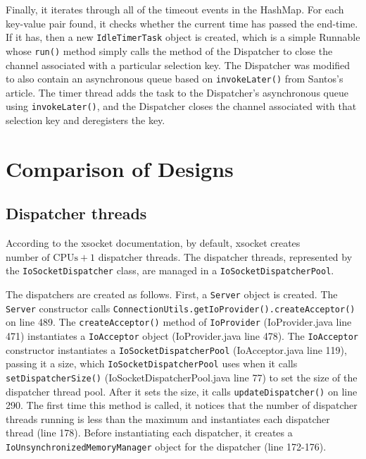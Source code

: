 \documentclass[letterpaper,12pt]{article}
\begin{document}
Finally, it iterates through all of the timeout events in the HashMap. For each key-value pair found, it checks whether the current time has passed the end-time. If it has, then a new \texttt{IdleTimerTask} object is created, which is a simple Runnable whose \texttt{run()} method simply calls the method of the Dispatcher to close the channel associated with a particular selection key. The Dispatcher was modified to also contain an asynchronous queue based on \texttt{invokeLater()} from Santos's article. The timer thread adds the task to the Dispatcher's asynchronous queue using \texttt{invokeLater()}, and the Dispatcher closes the channel associated with that selection key and deregisters the key.


\section{Comparison of Designs}

\subsection{Dispatcher threads}

According to the xsocket documentation, by default, xsocket creates $\text{number of CPUs} + 1$ dispatcher threads. The dispatcher threads, represented by the \texttt{IoSocketDispatcher} class, are managed in a \texttt{IoSocketDispatcherPool}.

The dispatchers are created as follows. First, a \texttt{Server} object is created. The \texttt{Server} constructor calls \texttt{ConnectionUtils.getIoProvider().createAcceptor()} on line 489. The \texttt{createAcceptor()} method of \texttt{IoProvider} (IoProvider.java line 471) instantiates a \texttt{IoAcceptor} object (IoProvider.java line 478). The \texttt{IoAcceptor} constructor instantiates a \texttt{IoSocketDispatcherPool} (IoAcceptor.java line 119), passing it a size, which \texttt{IoSocketDispatcherPool} uses when it calls \texttt{setDispatcherSize()} (IoSocketDispatcherPool.java line 77) to set the size of the dispatcher thread pool. After it sets the size, it calls \texttt{updateDispatcher()} on line 290. The first time this method is called, it notices that the number of dispatcher threads running is less than the maximum and instantiates each dispatcher thread (line 178). Before instantiating each dispatcher, it creates a \texttt{IoUnsynchronizedMemoryManager} object for the dispatcher (line 172-176).
\end{document}
